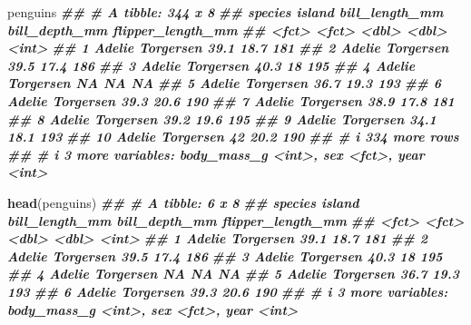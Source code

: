 \documentclass[
]{article}
\newenvironment{Shaded}{\begin{snugshade}}{\end{snugshade}}
\newcommand{\DocumentationTok}[1]{\textcolor[rgb]{0.56,0.35,0.01}{\textbf{\textit{#1}}}}
\newcommand{\FunctionTok}[1]{\textcolor[rgb]{0.13,0.29,0.53}{\textbf{#1}}}
\newcommand{\NormalTok}[1]{#1}
\begin{document}
\begin{Shaded}
\begin{Highlighting}[]
\NormalTok{penguins}
\DocumentationTok{\#\# \# A tibble: 344 x 8}
\DocumentationTok{\#\#    species island    bill\_length\_mm bill\_depth\_mm flipper\_length\_mm}
\DocumentationTok{\#\#    \textless{}fct\textgreater{}   \textless{}fct\textgreater{}              \textless{}dbl\textgreater{}         \textless{}dbl\textgreater{}             \textless{}int\textgreater{}}
\DocumentationTok{\#\#  1 Adelie  Torgersen           39.1          18.7               181}
\DocumentationTok{\#\#  2 Adelie  Torgersen           39.5          17.4               186}
\DocumentationTok{\#\#  3 Adelie  Torgersen           40.3          18                 195}
\DocumentationTok{\#\#  4 Adelie  Torgersen           NA            NA                  NA}
\DocumentationTok{\#\#  5 Adelie  Torgersen           36.7          19.3               193}
\DocumentationTok{\#\#  6 Adelie  Torgersen           39.3          20.6               190}
\DocumentationTok{\#\#  7 Adelie  Torgersen           38.9          17.8               181}
\DocumentationTok{\#\#  8 Adelie  Torgersen           39.2          19.6               195}
\DocumentationTok{\#\#  9 Adelie  Torgersen           34.1          18.1               193}
\DocumentationTok{\#\# 10 Adelie  Torgersen           42            20.2               190}
\DocumentationTok{\#\# \# i 334 more rows}
\DocumentationTok{\#\# \# i 3 more variables: body\_mass\_g \textless{}int\textgreater{}, sex \textless{}fct\textgreater{}, year \textless{}int\textgreater{}}

\FunctionTok{head}\NormalTok{(penguins)}
\DocumentationTok{\#\# \# A tibble: 6 x 8}
\DocumentationTok{\#\#   species island    bill\_length\_mm bill\_depth\_mm flipper\_length\_mm}
\DocumentationTok{\#\#   \textless{}fct\textgreater{}   \textless{}fct\textgreater{}              \textless{}dbl\textgreater{}         \textless{}dbl\textgreater{}             \textless{}int\textgreater{}}
\DocumentationTok{\#\# 1 Adelie  Torgersen           39.1          18.7               181}
\DocumentationTok{\#\# 2 Adelie  Torgersen           39.5          17.4               186}
\DocumentationTok{\#\# 3 Adelie  Torgersen           40.3          18                 195}
\DocumentationTok{\#\# 4 Adelie  Torgersen           NA            NA                  NA}
\DocumentationTok{\#\# 5 Adelie  Torgersen           36.7          19.3               193}
\DocumentationTok{\#\# 6 Adelie  Torgersen           39.3          20.6               190}
\DocumentationTok{\#\# \# i 3 more variables: body\_mass\_g \textless{}int\textgreater{}, sex \textless{}fct\textgreater{}, year \textless{}int\textgreater{}}


\end{Highlighting}
\end{Shaded}
\end{document}
